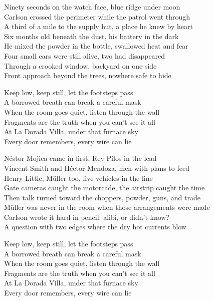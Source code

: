\begin{lyrics}
Ninety seconds on the watch face, blue ridge under moon\\
Carlson crossed the perimeter while the patrol went through\\
A third of a mile to the supply hut, a place he knew by heart\\
Six months old beneath the dust, his battery in the dark\\
He mixed the powder in the bottle, swallowed heat and fear\\
Four small ears were still alive, two had disappeared\\
Through a crooked window, backyard on one side\\
Front approach beyond the trees, nowhere safe to hide

Keep low, keep still, let the footsteps pass\\
A borrowed breath can break a careful mask\\
When the room goes quiet, listen through the wall\\
Fragments are the truth when you can't see it all\\
At La Dorada Villa, under that furnace sky\\
Every door remembers, every wire can lie

Néstor Mojica came in first, Rey Pilos in the lead\\
Vincent Smith and Héctor Mendoza, men with plans to feed\\
Henry Little, Müller too, five vehicles in the line\\
Gate cameras caught the motorcade, the airstrip caught the time\\
Then talk turned toward the choppers, powder, guns, and trade\\
Müller was never in the room when those arrangements were made\\
Carlson wrote it hard in pencil: alibi, or didn't know?\\
A question with two edges where the dry hot currents blow

Keep low, keep still, let the footsteps pass\\
A borrowed breath can break a careful mask\\
When the room goes quiet, listen through the wall\\
Fragments are the truth when you can't see it all\\
At La Dorada Villa, under that furnace sky\\
Every door remembers, every wire can lie


\end{lyrics}
